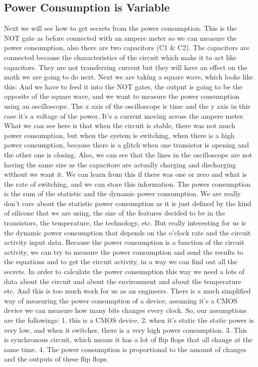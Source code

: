 \subsection { Power Consumption is Variable }
Next we will see how to get secrets from the power consumption.
This is the NOT gate as before connected with an ampere meter so we can measure the power consumption, also there are two capacitors (C1 \& C2). The capacitors are connected because the characteristics of the circuit which make it to act like capacitors. They are not transferring current but they will have an effect on the math we are going to do next.
Next we are taking a square wave, which looks like this:
And we have to feed it into the NOT gates, the output is going to be the opposite of the square wave, and we want to measure the power consumption using an oscilloscope.
The x axis of the oscilloscope is time and the y axis in this case it's a voltage of the power. It's a current moving across the ampere meter. What we can see here is that when the circuit is stable, there was not much power consumption, but when the system is switching, when there is a high power consumption, because there is a glitch when one transistor is opening and the other one is closing.
Also, we can see that the lines in the oscilloscope are not having the same size as the capacitors are actually charging and discharging without we want it. We can learn from this if there was one or zero and what is the rate of switching, and we can store this information.
The power consumption is the sum of the statistic and the dynamic power consumption. 
We are really don’t care about the statistic power consumption as it is just defined by the kind of silicone that we are using, the size of the features decided to be in the transistors, the temperature, the technology, etc. But really interesting for us is the dynamic power consumption that depends on the o'clock rate and the circuit activity input data.
Because the power consumption is a function of the circuit activity, we can try to measure the power consumption and send the results to the equations and to get the circuit activity, in a way we can find out all the secrets.
In order to calculate the power consumption this way we need a lots of data about the circuit and about the environment and about the temperature etc. And this is too much work for us as an engineers. There is a much simplified way of measuring the power consumption of a device, assuming it's a CMOS device we can measure how many bits changes every clock.
So, our assumptions are the followings: 1. this is a CMOS device. 2. when it’s static the static power is very low, and when it switches, there is a very high power consumption. 3. This is synchronous circuit, which means it has a lot of flip flops that all change at the same time. 4. The power consumption is proportional to the amount of changes and the outputs of these flip flops.
